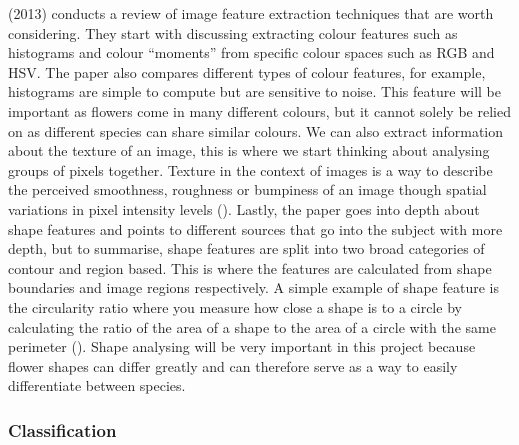 \documentclass{article}
\begin{document}
\citeauthor{tian2013} (2013) conducts a review of image feature extraction techniques that are worth considering. They 
start with discussing extracting colour features such as histograms and colour “moments” from specific colour spaces 
such as RGB and HSV. The paper also compares different types of colour features, for example, histograms are simple to 
compute but are sensitive to noise.  This feature will be important as flowers come in many different colours, but it 
cannot solely be relied on as different species can share similar colours. We can also extract information about 
the texture of an image, this is where we start thinking about analysing groups of pixels together. Texture in the 
context of images is a way to describe the perceived smoothness, roughness or bumpiness of an image though spatial 
variations in pixel intensity levels (\cite{mathworks}). Lastly, the paper goes into depth about shape features and 
points to different sources that go into the subject with more depth, but to summarise, shape features are 
split into two broad categories of contour and region based. This is where the features are calculated from shape 
boundaries and image regions respectively. A simple example of shape feature is the circularity ratio where you measure 
how close a shape is to a circle by calculating the ratio of the area of a shape to the area of a circle with the same 
perimeter (\cite{mingqiang2008survey}). Shape analysing will be very important in this project because flower shapes can
differ greatly and can therefore serve as a way to easily differentiate between species.

\subsubsection{Classification}
\end{document}

